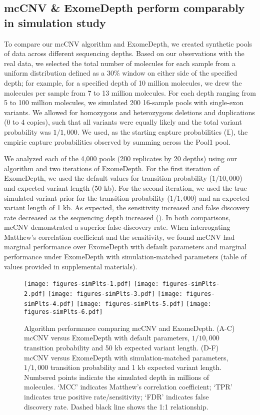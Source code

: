 \documentclass{article}\usepackage[]{graphicx}\usepackage[]{color}
\begin{document}
\subsection{mcCNV \& ExomeDepth perform comparably in simulation study}

To compare our mcCNV algorithm and ExomeDepth, we created synthetic pools of data across different sequencing depths.
Based on our observations with the real data, we selected the total number of molecules for each sample from a uniform distribution defined as a 30\% window on either side of the specified depth; for example, for a specified depth of 10 million molecules, we drew the molecules per sample from 7 to 13 million molecules.
For each depth ranging from 5 to 100 million molecules, we simulated 200 16-sample pools with single-exon variants.
We allowed for homozygous and heterozygous deletions and duplications (0 to 4 copies), such that all variants were equally likely and the total variant probability was $1/1,000$.
We used, as the starting capture probabilities ($\mathbb{E}$), the empiric capture probabilities observed by summing across the Pool1 pool.

We analyzed each of the 4,000 pools (200 replicates by 20 depths) using our algorithm and two iterations of ExomeDepth.
For the first iteration of ExomeDepth, we used the default values for transition probability ($1/10,000$) and expected variant length (50 kb).
For the second iteration, we used the true simulated variant prior for the transition probability ($1/1,000$) and an expected variant length of 1 kb.
As expected, the sensitivity increased and false discovery rate decreased as the sequencing depth increased ().
In both comparisons, mcCNV demonstrated a superior false-discovery rate.
When interrogating Matthew's correlation coefficient \cite{matthews:1975aa} and the sensitivity, we found mcCNV had marginal performance over ExomeDepth with default parameters and marginal performance under ExomeDepth with simulation-matched parameters (table of values provided in supplemental materials).

\begin{figure}
  \centering
  \texttt{[image: figures-simPlts-1.pdf]}%
  \texttt{[image: figures-simPlts-2.pdf]}%
  \texttt{[image: figures-simPlts-3.pdf]}
  \texttt{[image: figures-simPlts-4.pdf]}%
  \texttt{[image: figures-simPlts-5.pdf]}%
  \texttt{[image: figures-simPlts-6.pdf]}
  \caption{Algorithm performance comparing mcCNV and ExomeDepth. (A-C) mcCNV versus ExomeDepth with default parameters, $1/10,000$ transition probability and 50 kb expected variant length. (D-F) mcCNV versus ExomeDepth with simulation-matched parameters, $1/1,000$ transition probability and 1 kb expected variant length. Numbered points indicate the simulated depth in millions of molecules. `MCC' indicates Matthew's correlation coefficient; `TPR' indicates true positive rate/sensitivity; `FDR' indicates false discovery rate. Dashed black line shows the 1:1 relationship.}
  \label{fig:simRes}
\end{figure}
\end{document}
